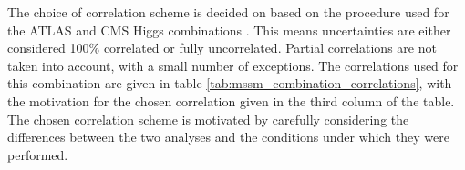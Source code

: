 The choice of correlation scheme is decided on
based on the procedure used for the ATLAS and \ac{CMS}
Higgs combinations \cite{MassComb,CouplComb}. This means
uncertainties are either considered 100\% correlated or fully uncorrelated. Partial
correlations are not taken into account, with a small number of exceptions. The
correlations used for this combination are given in table \ref{tab:mssm_combination_correlations},
with the motivation for the chosen correlation given in the third column of the table.
The chosen correlation scheme is motivated
by carefully considering the differences between the two analyses
and the conditions under which they were performed.


